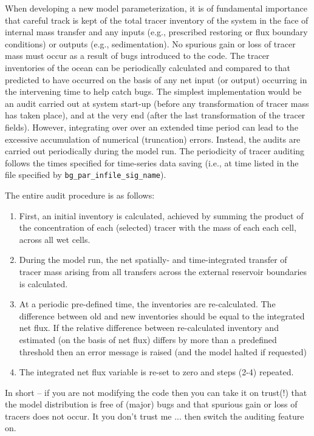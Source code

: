 \documentclass[11pt,fleqn]{book} %
\begin{document}
When developing a new model parameterization, it is of fundamental importance that careful track is kept of the total tracer inventory of the system in the face of internal mass transfer and any inputs (e.g., prescribed restoring or flux boundary conditions) or outputs (e.g., sedimentation). No spurious gain or loss of tracer mass must occur as a result of bugs introduced to the code. The tracer inventories of the ocean can be periodically calculated and compared to that predicted to have occurred on the basis of any net input (or output) occurring in the intervening time to help catch bugs. The simplest implementation would be an audit carried out at system start-up (before any transformation of tracer mass has taken place), and at the very end (after the last transformation of the tracer fields). However, integrating over over an extended time period can lead to the excessive accumulation of numerical (truncation) errors. Instead, the audits are carried out periodically during the model run. The periodicity of tracer auditing follows the times specified for time-series data saving (i.e., at time listed in the file specified by \texttt{bg\_par\_infile\_sig\_name}).

The entire audit procedure is as follows:

\begin{enumerate}[noitemsep]
\setlength{\itemindent}{.2in}

\item First, an initial inventory is calculated, achieved by summing the product of the concentration of each (selected) tracer with the mass of each each cell, across all wet cells.
\item During the model run, the net spatially- and time-integrated transfer of tracer mass arising from all transfers across the external reservoir boundaries is calculated. 
\item At a periodic pre-defined time, the inventories are re-calculated. The difference between old and new inventories should be equal to the integrated net flux. If the relative difference between re-calculated inventory and estimated (on the basis of net flux) differs by more than a predefined threshold then an error message is raised (and the model halted if requested)
\item The integrated net flux variable is re-set to zero and steps (2-4) repeated.

\end{enumerate}

In short -- if you are not modifying the code then you can take it on trust(!) that the model distribution is free of (major) bugs and that spurious gain or loss of tracers does not occur. It you don't trust me ... then switch the auditing feature on.
\end{document}
